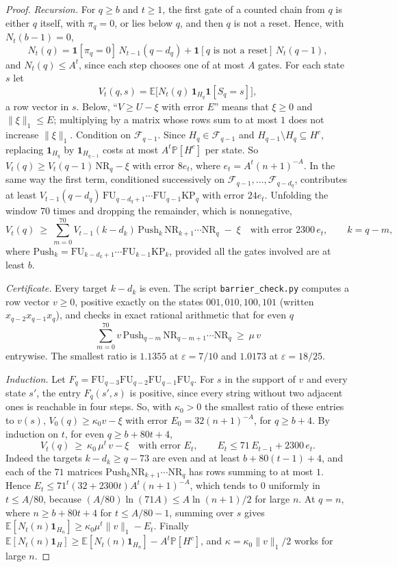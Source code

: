 \documentclass[11pt]{amsart}
\theoremstyle{definition}
\theoremstyle{remark}
\newcommand{\eps}{\varepsilon}
\newcommand{\PP}{\mathbb{P}}
\newcommand{\EE}{\mathbb{E}}
\newcommand{\cF}{\mathcal{F}}
\begin{document}
\begin{proof}
\emph{Recursion.} For $q\ge b$ and $t\ge1$, the first gate of a counted chain from $q$ is either $q$
itself, with $\pi_q=0$, or lies below $q$, and then $q$ is not a reset. Hence, with $N_t(b-1)=0$,
\[
N_t(q)=\mathbf 1[\pi_q=0]\,N_{t-1}(q-d_q)+\mathbf 1[q\text{ is not a reset}]\,N_t(q-1),
\]
and $N_t(q)\le A^t$, since each step chooses one of at most $A$ gates. For each state $s$ let
\[
V_t(q,s)=\EE\bigl[N_t(q)\,\mathbf 1_{H_q}\mathbf 1[S_q=s]\bigr],
\]
a row vector in $s$. Below, ``$V\ge U-\xi$
with error $E$'' means that $\xi\ge0$ and $\|\xi\|_1\le E$; multiplying by a matrix whose rows sum
to at most $1$ does not increase $\|\xi\|_1$. Condition on $\cF_{q-1}$. Since $H_q\in\cF_{q-1}$ and
$H_{q-1}\setminus H_q\subseteq H^c$, replacing $\mathbf 1_{H_q}$ by $\mathbf 1_{H_{q-1}}$ costs at
most $A^t\PP[H^c]$ per state. So $V_t(q)\ge V_t(q-1)\,\mathrm{NR}_q-\xi$ with error $8e_t$,
where $e_t=A^t(n+1)^{-A}$. In the same way the first term, conditioned successively on
$\cF_{q-1},\dots,\cF_{q-d_q}$, contributes at least
$V_{t-1}(q-d_q)\,\mathrm{FU}_{q-d_q+1}\cdots\mathrm{FU}_{q-1}\mathrm{KP}_q$ with error $24e_t$.
Unfolding the window $70$ times and dropping the remainder, which is nonnegative,
\[
V_t(q)\ \ge\ \sum_{m=0}^{70}V_{t-1}(k-d_k)\,\mathrm{Push}_k\,\mathrm{NR}_{k+1}\cdots\mathrm{NR}_q
\;-\;\xi\quad\text{with error }2300\,e_t,\qquad k=q-m,
\]
where $\mathrm{Push}_k=\mathrm{FU}_{k-d_k+1}\cdots\mathrm{FU}_{k-1}\mathrm{KP}_k$, provided all the
gates involved are at least $b$.

\emph{Certificate.} Every target $k-d_k$ is even. The script \texttt{barrier\_check.py} computes a
row vector $v\ge0$, positive exactly on the states $001,010,100,101$ (written
$x_{q-2}x_{q-1}x_q$), and checks in exact rational arithmetic that for even $q$
\[
\sum_{m=0}^{70}v\,\mathrm{Push}_{q-m}\,\mathrm{NR}_{q-m+1}\cdots\mathrm{NR}_q\ \ge\ \mu\,v
\]
entrywise. The smallest ratio is $1.1355$ at $\eps=7/10$ and $1.0173$ at $\eps=18/25$.

\emph{Induction.} Let $F_q=\mathrm{FU}_{q-3}\mathrm{FU}_{q-2}\mathrm{FU}_{q-1}\mathrm{FU}_q$. For $s$
in the support of $v$ and every state $s'$, the entry $F_q(s',s)$ is positive, since every string
without two adjacent ones is reachable in four steps. So, with $\kappa_0>0$ the smallest ratio of
these entries to $v(s)$, $V_0(q)\ge\kappa_0v-\xi$ with error $E_0=32(n+1)^{-A}$, for $q\ge b+4$. By induction on $t$, for even $q\ge b+80t+4$,
\[
V_t(q)\ \ge\ \kappa_0\,\mu^t\,v-\xi\quad\text{with error }E_t,\qquad E_t\le71\,E_{t-1}+2300\,e_t .
\]
Indeed the targets $k-d_k\ge q-73$ are even and at least $b+80(t-1)+4$, and each of the $71$
matrices $\mathrm{Push}_k\mathrm{NR}_{k+1}\cdots\mathrm{NR}_q$ has rows summing to at most $1$. Hence
$E_t\le71^t(32+2300t)A^t(n+1)^{-A}$, which tends to $0$ uniformly in $t\le A/80$, because
$(A/80)\ln(71A)\le A\ln(n+1)/2$ for large $n$. At $q=n$, where $n\ge b+80t+4$ for $t\le A/80-1$,
summing over $s$ gives $\EE[N_t(n)\mathbf 1_{H_n}]\ge\kappa_0\mu^t\|v\|_1-E_t$. Finally
$\EE[N_t(n)\mathbf 1_H]\ge\EE[N_t(n)\mathbf 1_{H_n}]-A^t\PP[H^c]$, and $\kappa=\kappa_0\|v\|_1/2$
works for large $n$.
\end{proof}
\end{document}
